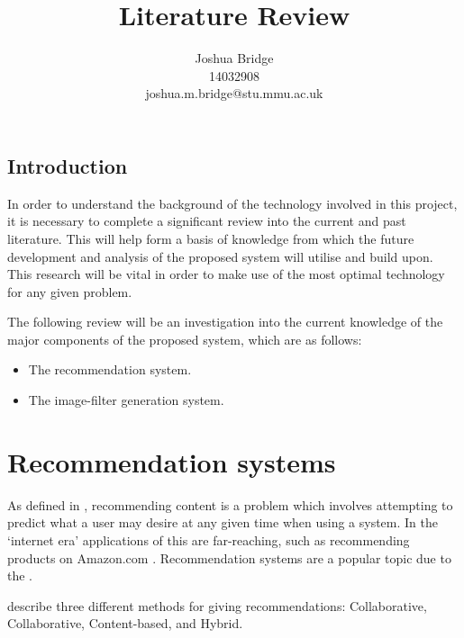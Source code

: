 \documentclass[a4paper,12pt]{article}
\title{Literature Review}
\author{Joshua Bridge \\14032908 \\joshua.m.bridge@stu.mmu.ac.uk}
\begin{document}
\maketitle


\tableofcontents

\listoffigures

\doublespacing

\subsection{Introduction}
  In order to understand the background of the technology involved in this project, it is necessary to complete a significant review into the current and past literature. This will help form a basis of knowledge from which the future development and analysis of the proposed system will utilise and build upon. This research will be vital in order to make use of the most optimal technology for any given problem.

  The following review will be an investigation into the current knowledge of the major components of the proposed system, which are as follows:

  \begin{itemize}
    \item The recommendation system.
    \item The image-filter generation system.
  \end{itemize}

\section{Recommendation systems}
  As defined in \cite{ricci2011introduction}, recommending content is a problem which involves attempting to predict what a user may desire at any given time when using a system. In the ‘internet era’ applications of this are far-reaching, such as recommending products on Amazon.com \cite{linden2003amazon}. Recommendation systems are a popular topic due to the  \citep{adomavicius2005toward}.

  \cite{jannach2010recommender} describe three different methods for giving recommendations: Collaborative, Collaborative, Content-based, and Hybrid.
\end{document}
